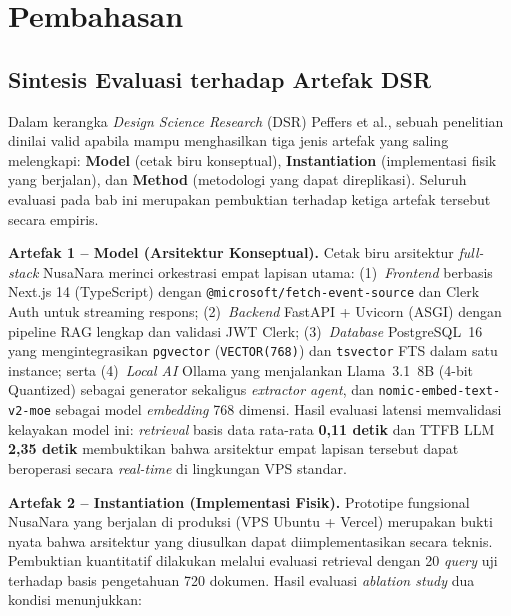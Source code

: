 \section{Pembahasan}

\subsection{Sintesis Evaluasi terhadap Artefak DSR}

Dalam kerangka \textit{Design Science Research} (DSR) Peffers et al., sebuah penelitian dinilai valid apabila mampu menghasilkan tiga jenis artefak yang saling melengkapi: \textbf{Model} (cetak biru konseptual), \textbf{Instantiation} (implementasi fisik yang berjalan), dan \textbf{Method} (metodologi yang dapat direplikasi). Seluruh evaluasi pada bab ini merupakan pembuktian terhadap ketiga artefak tersebut secara empiris.

\textbf{Artefak 1 -- Model (Arsitektur Konseptual).}
Cetak biru arsitektur \textit{full-stack} NusaNara merinci orkestrasi empat lapisan utama: (1)~\textit{Frontend} berbasis Next.js 14 (TypeScript) dengan \texttt{@microsoft/fetch-event-source} dan Clerk Auth untuk streaming respons; (2)~\textit{Backend} FastAPI + Uvicorn (ASGI) dengan pipeline RAG lengkap dan validasi JWT Clerk; (3)~\textit{Database} PostgreSQL~16 yang mengintegrasikan \texttt{pgvector} (\texttt{VECTOR(768)}) dan \texttt{tsvector} FTS dalam satu instance; serta (4)~\textit{Local AI} Ollama yang menjalankan Llama~3.1~8B (4-bit Quantized) sebagai generator sekaligus \textit{extractor agent}, dan \texttt{nomic-embed-text-v2-moe} sebagai model \textit{embedding} 768 dimensi. Hasil evaluasi latensi memvalidasi kelayakan model ini: \textit{retrieval} basis data rata-rata \textbf{0{,}11 detik} dan TTFB LLM \textbf{2{,}35 detik} membuktikan bahwa arsitektur empat lapisan tersebut dapat beroperasi secara \textit{real-time} di lingkungan VPS standar.

\textbf{Artefak 2 -- Instantiation (Implementasi Fisik).}
Proto\-tipe fungsional NusaNara yang berjalan di produksi (VPS Ubuntu + Vercel) merupakan bukti nyata bahwa arsitektur yang diusulkan dapat diimplementasikan secara teknis. Pembuktian kuantitatif dilakukan melalui evaluasi retrieval dengan 20 \textit{query} uji terhadap basis pengetahuan 720 dokumen. Hasil evaluasi \textit{ablation study} dua kondisi menunjukkan:

